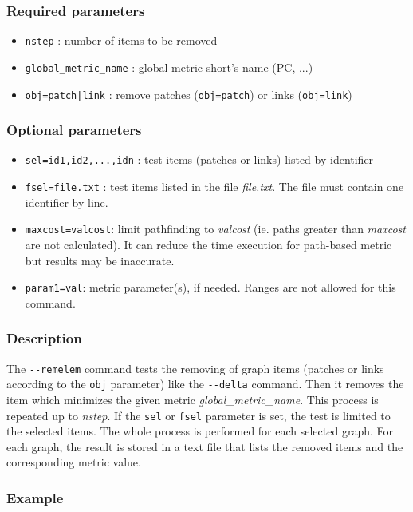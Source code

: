 \documentclass[a4paper,10pt]{report}
\begin{document}
\subsubsection{Required parameters}
\begin{itemize}
	\item \verb|nstep| : number of items to be removed
	\item \verb|global_metric_name| : global metric short's name (PC, ...)
	\item \verb+obj=patch|link+ : remove patches (\verb+obj=patch+) or links (\verb+obj=link+)
\end{itemize}

\subsubsection{Optional parameters}
\begin{itemize}
	\item \verb|sel=id1,id2,...,idn| : test items (patches or links) listed by identifier
	\item \verb|fsel=file.txt| : test items listed in the file \textit{file.txt}. The file must contain one identifier by line.
	\item \verb|maxcost=valcost|: limit pathfinding to \textit{valcost} (ie. paths greater than \textit{maxcost} are not calculated). It can reduce the time execution for path-based metric but results may be inaccurate.
	\item \verb|param1=val|: metric parameter(s), if needed. Ranges are not allowed for this command.
\end{itemize}

\subsubsection{Description}
The \verb|--remelem| command tests the removing of graph items (patches or links according to the \verb|obj| parameter) like the \verb|--delta| command. Then it removes the item which minimizes the given metric \textit{global\_metric\_name}. This process is repeated up to \textit{nstep}.
If the \verb|sel| or \verb|fsel| parameter is set, the test is limited to the selected items.
The whole process is performed for each selected graph. For each graph, the result
is stored in a text file that lists the removed items and the corresponding metric value.

\subsubsection{Example}
\end{document}

